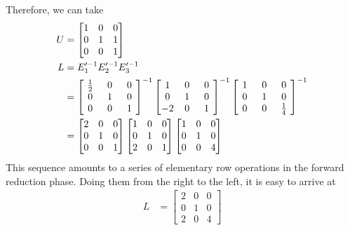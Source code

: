 \begin{solution}
Therefore, we can take
\begin{align*}
U &= 
\begin{bmatrix}
1 & 0 & 0 \\
0 & 1 & 1 \\
0 & 0 & 1 
\end{bmatrix}
\\
L &= E_1'^{-1}E_2'^{-1}E_3'^{-1} \\
&=
\left[\begin{array}{@{\,}wc{10pt}wc{10pt}wc{10pt}@{\,}}
\frac{1}{2} & 0 & 0 \\
0 & 1 & 0 \\
0 & 0 & 1 
\end{array}\right]^{-1}
\left[\begin{array}{@{\,}wc{10pt}wc{10pt}wc{10pt}@{\,}}
1 & 0 & 0 \\
0 & 1 & 0 \\
-2 & 0 & 1 
\end{array}\right]^{-1}
\left[\begin{array}{@{\,}wc{10pt}wc{10pt}wc{10pt}@{\,}}
1 & 0 & 0 \\
0 & 1 & 0 \\
0 & 0 & \frac{1}{4} 
\end{array}\right]
^{-1} \\
&= \begin{bmatrix}
2 & 0 & 0 \\
0 & 1 & 0 \\
0 & 0 & 1 
\end{bmatrix}
\begin{bmatrix}
1 & 0 & 0 \\
0 & 1 & 0 \\
2 & 0 & 1 
\end{bmatrix}
\begin{bmatrix}
1 & 0 & 0 \\
0 & 1 & 0 \\
0 & 0 & 4 
\end{bmatrix}
\end{align*}
This sequence amounts to a series of elementary row operations in the forward reduction phase. Doing them from the right to the left, it is easy to arrive at
\begin{align*}
L &=
\begin{bmatrix}
2 & 0 & 0 \\
0 & 1 & 0 \\
2 & 0 & 4
\end{bmatrix}
\end{align*}
\end{solution}

